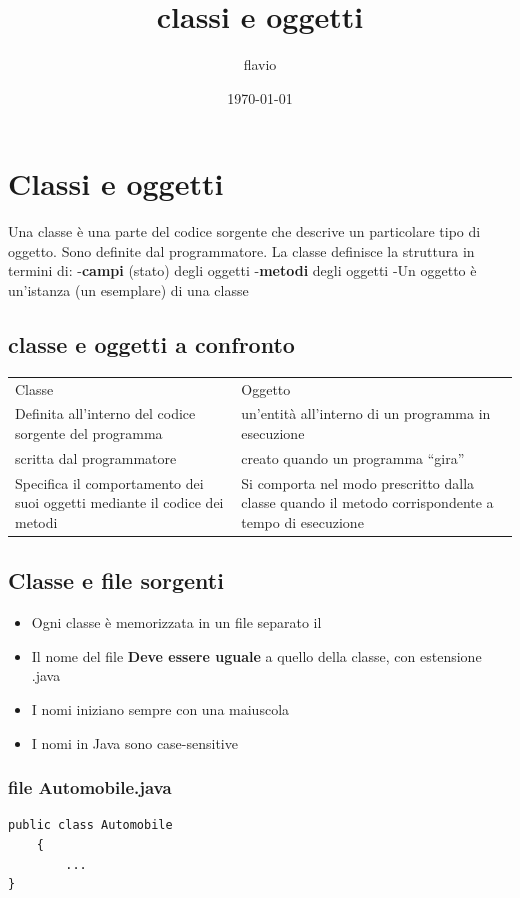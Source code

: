 \documentclass[11pt]{article}
\author{flavio}
\date{\today}
\title{classi e oggetti}
\begin{document}
\maketitle
\tableofcontents

\section{Classi e oggetti}
\label{sec:orgea3bdd5}

Una classe è una parte del codice sorgente che descrive un particolare tipo di oggetto.
Sono definite dal programmatore.
La classe definisce la struttura in termini di:
-\textbf{campi} (stato) degli oggetti
-\textbf{metodi} degli oggetti
-Un oggetto è un'istanza (un esemplare) di una classe
\subsection{classe e oggetti a confronto}
\label{sec:org90e9d01}

\begin{center}
\begin{tabular}{ll}
Classe & Oggetto\\
Definita all'interno del codice sorgente del programma & un'entità all'interno di un programma in esecuzione\\
scritta dal programmatore & creato quando un programma ``gira''\\
Specifica il comportamento dei suoi oggetti mediante il codice dei metodi & Si comporta nel modo prescritto dalla classe quando il metodo corrispondente a tempo di esecuzione\\
\end{tabular}
\end{center}
\subsection{Classe e file sorgenti}
\label{sec:orgaaef0e0}
\begin{itemize}
\item Ogni classe è memorizzata in un file separato il
\item Il nome del file \textbf{Deve essere uguale} a quello della classe, con estensione .java
\item I nomi iniziano sempre con una maiuscola
\item I nomi in Java sono case-sensitive
\end{itemize}
\subsubsection{file Automobile.java}
\label{sec:orgb388166}
\begin{verbatim}
public class Automobile
    {
        ...
}
\end{verbatim}
\end{document}

